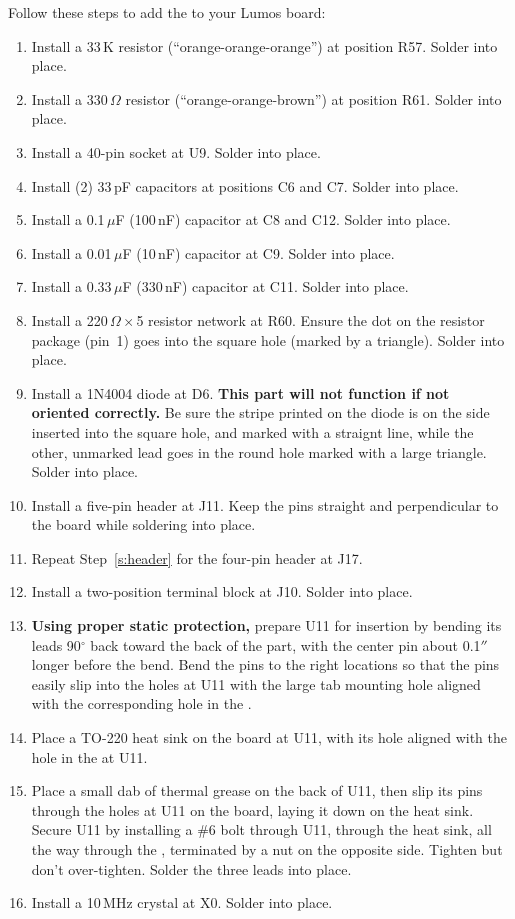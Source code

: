 \documentclass[letterpaper,twoside,onecolumn,openright,final]{memoir}
\begin{document}
Follow these steps to add the  to your Lumos board:
\begin{enumerate}
\item	Install a 33\,K resistor (``orange-orange-orange'') at position R57.  Solder into place.
\item	Install a 330\,$\Omega$ resistor (``orange-orange-brown'') at position R61.  Solder into place.
\item	Install a 40-pin  socket at U9. Solder into place.

\item	Install (2) 33\,pF capacitors at positions C6 and C7. Solder into place.
\item	Install a 0.1\,$\mu$F (100\,nF) capacitor at C8 and C12.  Solder into place.
\item	Install a 0.01\,$\mu$F (10\,nF) capacitor at C9. Solder into place.
\item	Install a 0.33\,$\mu$F (330\,nF) capacitor at C11.  Solder into place.
\item	Install a 220\,$\Omega\times$5 resistor network at R60.  Ensure the dot on the resistor package
	(pin~1) goes into the square hole (marked by a triangle).  Solder into place.
\item	Install a 1N4004 diode at D6.  {\bfseries This part will not function if not oriented
	correctly.} Be sure the stripe printed on the diode is on the side inserted into the
	square hole, and marked with a straignt line, while the other, unmarked lead goes in the
	round hole marked with a large triangle.  Solder into place.
\item\label{s:header}
	Install a five-pin header at J11.  Keep the pins straight and perpendicular to the board
	while soldering into place.
\item	Repeat Step~\ref{s:header} for the four-pin header at J17.
\item	Install a two-position terminal block at J10.  Solder into place.
\item	{\bfseries Using proper static protection,} prepare U11 for insertion by bending its
	leads 90$^\circ$ back toward the back of the part, with the center pin about 0.1$''$ longer
	before the bend.  Bend the pins to the right locations so that the pins easily
	slip into the holes at U11 with the large tab mounting hole aligned with the corresponding hole in
	the .
\item	Place a TO-220 heat sink on the board at U11, with its hole aligned with the hole in the
	 at U11.
\item	Place a small dab of thermal grease on the back of U11, then slip its pins through the holes
	at U11 on the board, laying it down on the heat sink.  Secure U11 by installing a \#6
	bolt through U11, through the heat sink, all the way through the , terminated
	by a nut on the opposite side.  Tighten but don't over-tighten.  Solder the three leads
	into place.
\item	Install a 10\,MHz crystal at X0.  Solder into place.



\end{enumerate}
\end{document}
